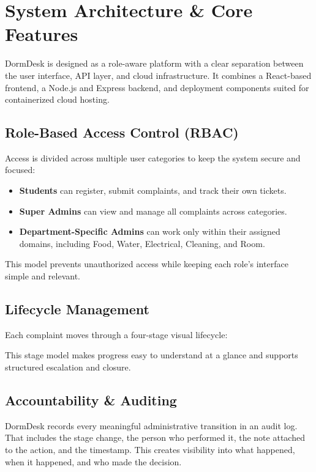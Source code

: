 \documentclass[11pt,a4paper]{article}
\begin{document}
\section{System Architecture \& Core Features}
DormDesk is designed as a role-aware platform with a clear separation between the user interface, API layer, and cloud infrastructure. It combines a React-based frontend, a Node.js and Express backend, and deployment components suited for containerized cloud hosting.

\subsection{Role-Based Access Control (RBAC)}
Access is divided across multiple user categories to keep the system secure and focused:
\begin{itemize}
  \item \textbf{Students} can register, submit complaints, and track their own tickets.
  \item \textbf{Super Admins} can view and manage all complaints across categories.
  \item \textbf{Department-Specific Admins} can work only within their assigned domains, including Food, Water, Electrical, Cleaning, and Room.
\end{itemize}
This model prevents unauthorized access while keeping each role’s interface simple and relevant.

\subsection{Lifecycle Management}
Each complaint moves through a four-stage visual lifecycle:
\begin{center}
\end{center}
This stage model makes progress easy to understand at a glance and supports structured escalation and closure.

\subsection{Accountability \& Auditing}
DormDesk records every meaningful administrative transition in an audit log. That includes the stage change, the person who performed it, the note attached to the action, and the timestamp. This creates visibility into what happened, when it happened, and who made the decision.
\end{document}
